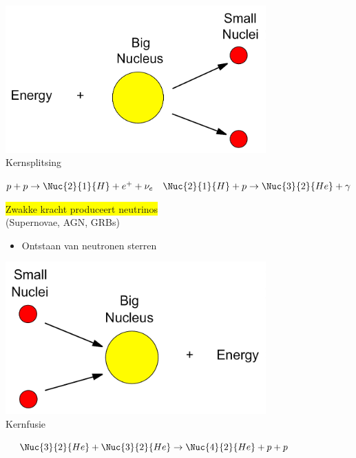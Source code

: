 \Tr
{}%
\begin{center}
\includegraphics[keepaspectratio,width=10cm]{nuclear-fission}\\[2mm]
{\blue Kernsplitsing}
\end{center}
%
$p+p \rightarrow \Nuc{2}{1}{H}+e^{+}+\nu_{e} \quad \Nuc{2}{1}{H}+p \rightarrow \Nuc{3}{2}{He}+\gamma$ 

\vspace{1cm}

\begin{center}
\colorbox{yellow}{Zwakke kracht produceert neutrinos}\\[2mm]
(Supernovae, AGN, GRBs)
\end{center}
%
\begin{itemize}
\item {\blue Ontstaan van neutronen sterren}
\end{itemize}

\newpage
\begin{center}
\includegraphics[keepaspectratio,width=10cm]{nuclear-fusion}\\[2mm]
{\blue Kernfusie}
\end{center}
%
$\quad \Nuc{3}{2}{He}+\Nuc{3}{2}{He} \rightarrow \Nuc{4}{2}{He}+p+p$

